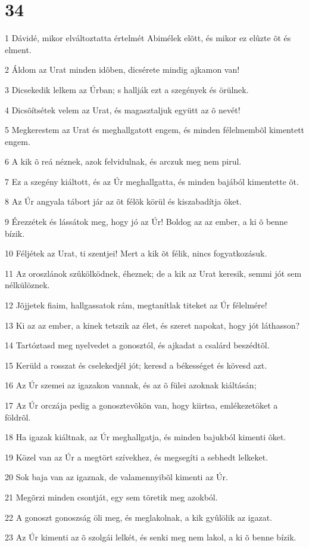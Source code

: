 \chapter{34}

\par 1 Dávidé, mikor elváltoztatta értelmét Abimélek elõtt, és mikor ez elûzte õt és elment.
\par 2 Áldom az Urat minden idõben, dicsérete mindig ajkamon van!
\par 3 Dicsekedik lelkem az Úrban; s hallják ezt a szegények és örülnek.
\par 4 Dicsõítsétek velem az Urat, és magasztaljuk együtt az õ nevét!
\par 5 Megkerestem az Urat és meghallgatott engem, és minden félelmembõl kimentett engem.
\par 6 A kik õ reá néznek, azok felvidulnak, és arczuk meg nem pirul.
\par 7 Ez a szegény kiáltott, és az Úr meghallgatta, és minden bajából kimentette õt.
\par 8 Az Úr angyala tábort jár az õt félõk körül és kiszabadítja õket.
\par 9 Érezzétek és lássátok meg, hogy jó az Úr! Boldog az az ember, a ki õ benne bízik.
\par 10 Féljétek az Urat, ti szentjei! Mert a kik õt félik, nincs fogyatkozásuk.
\par 11 Az oroszlánok szûkölködnek, éheznek; de a kik az Urat keresik, semmi jót sem nélkülöznek.
\par 12 Jõjjetek fiaim, hallgassatok rám, megtanítlak titeket az Úr félelmére!
\par 13 Ki az az ember, a kinek tetszik az élet, és szeret napokat, hogy jót láthasson?
\par 14 Tartóztasd meg nyelvedet a gonosztól, és ajkadat a csalárd beszédtõl.
\par 15 Kerüld a rosszat és cselekedjél jót; keresd a békességet és kövesd azt.
\par 16 Az Úr szemei az igazakon vannak, és az õ fülei azoknak kiáltásán;
\par 17 Az Úr orczája pedig a gonosztevõkön van, hogy kiirtsa, emlékezetöket a földrõl.
\par 18 Ha igazak kiáltnak, az Úr meghallgatja, és minden bajukból kimenti õket.
\par 19 Közel van az Úr a megtört szívekhez, és megsegíti a sebhedt lelkeket.
\par 20 Sok baja van az igaznak, de valamennyibõl kimenti az Úr.
\par 21 Megõrzi minden csontját, egy sem töretik meg azokból.
\par 22 A gonoszt gonoszság öli meg, és meglakolnak, a kik gyûlölik az igazat.
\par 23 Az Úr kimenti az õ szolgái lelkét, és senki meg nem lakol, a ki õ benne bízik.

